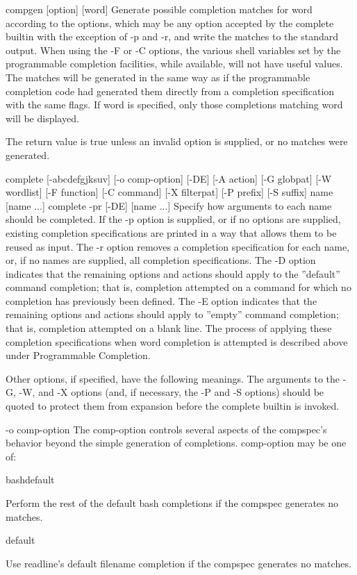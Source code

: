 compgen [option] [word]
Generate possible completion matches for word according to the options, which may be any option accepted by the complete builtin with the exception of -p and -r, and write the matches to the standard output. When using the -F or -C options, the various shell variables set by the programmable completion facilities, while available, will not have useful values.
The matches will be generated in the same way as if the programmable completion code had generated them directly from a completion specification with the same flags. If word is specified, only those completions matching word will be displayed.

The return value is true unless an invalid option is supplied, or no matches were generated.

complete [-abcdefgjksuv] [-o comp-option] [-DE] [-A action] [-G globpat] [-W wordlist] [-F function] [-C command]
[-X filterpat] [-P prefix] [-S suffix] name [name ...]
complete -pr [-DE] [name ...]
Specify how arguments to each name should be completed. If the -p option is supplied, or if no options are supplied, existing completion specifications are printed in a way that allows them to be reused as input. The -r option removes a completion specification for each name, or, if no names are supplied, all completion specifications. The -D option indicates that the remaining options and actions should apply to the ''default'' command completion; that is, completion attempted on a command for which no completion has previously been defined. The -E option indicates that the remaining options and actions should apply to ''empty'' command completion; that is, completion attempted on a blank line.
The process of applying these completion specifications when word completion is attempted is described above under Programmable Completion.

Other options, if specified, have the following meanings. The arguments to the -G, -W, and -X options (and, if necessary, the -P and -S options) should be quoted to protect them from expansion before the complete builtin is invoked.

-o comp-option
The comp-option controls several aspects of the compspec's behavior beyond the simple generation of completions. comp-option may be one of:

bashdefault

Perform the rest of the default bash completions if the compspec generates no matches.

default

Use readline's default filename completion if the compspec generates no matches.

